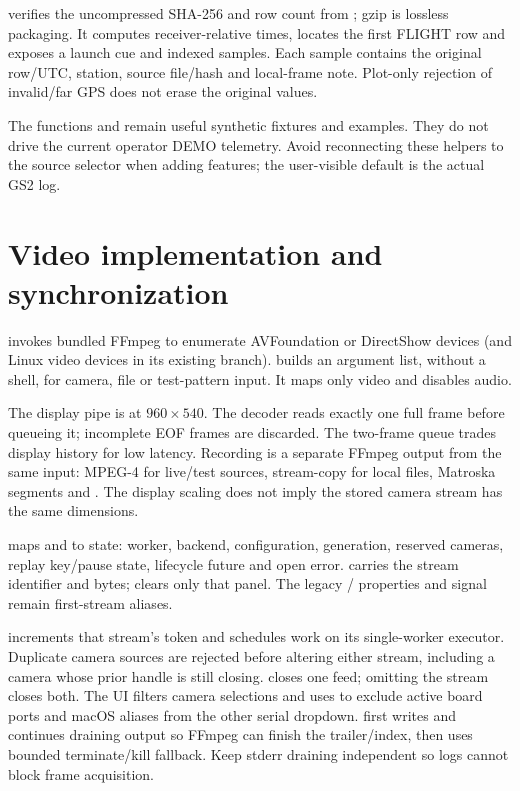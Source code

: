 verifies the uncompressed SHA-256 and row count from
; gzip is lossless packaging. It computes
receiver-relative times, locates the first FLIGHT row and exposes a launch cue
and indexed samples. Each sample contains the original row/UTC, station,
source file/hash and local-frame note. Plot-only rejection of invalid/far GPS
does not erase the original values.

The functions  and  remain useful
synthetic fixtures and examples. They do not drive the current operator DEMO
telemetry. Avoid reconnecting these helpers to the source selector when adding
features; the user-visible default is the actual GS2 log.

\section{Video implementation and synchronization}\label{sec:media}
 invokes bundled FFmpeg to enumerate AVFoundation or
DirectShow devices (and Linux video devices in its existing branch).
 builds an argument list, without a shell, for camera,
file or test-pattern input. It maps only video and disables audio.

The display pipe is  at \(960\times540\). The decoder reads exactly
one full frame before queueing it; incomplete EOF frames are discarded.
The two-frame queue trades display history for low latency. Recording is a
separate FFmpeg output from the same input: MPEG-4 for live/test sources,
stream-copy for local files, Matroska segments and .
The display scaling does not imply the stored camera stream has the same
dimensions.

 maps  and  to
 state: worker, backend, configuration, generation, reserved
cameras, replay key/pause state, lifecycle future and open error.  carries
the stream identifier and bytes;  clears only that panel.
The legacy / properties and  signal
remain first-stream aliases.

 increments that stream's token and
schedules work on its single-worker executor. Duplicate camera sources are
rejected before altering either stream, including a camera whose prior handle
is still closing.  closes one feed; omitting the stream
closes both. The UI filters camera selections and uses 
to exclude active board ports and macOS aliases from the other serial dropdown.  first writes  and continues
draining output so FFmpeg can finish the trailer/index, then uses bounded
terminate/kill fallback. Keep stderr draining independent so logs cannot block
frame acquisition.

